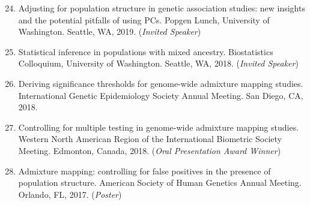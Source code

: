\documentclass[margin]{res}
\newenvironment{benumerate}[1]{
    \let\oldItem\item
    \def\item{\addtocounter{enumi}{-2}\oldItem}
    
    \begin{enumerate}
    \setcounter{enumi}{#1}
    \addtocounter{enumi}{1}
}{
    \end{enumerate}
}
\begin{document}
\begin{resume}
\begin{benumerate}{23}
\item Adjusting for population structure in genetic association studies: new insights and the potential pitfalls of using PCs. Popgen Lunch, University of Washington. Seattle, WA, 2019.  (\textit{Invited Speaker})




\item %
Statistical inference in populations with mixed ancestry. Biostatistics Colloquium, University of Washington. Seattle, WA, 2018.  (\textit{Invited Speaker})

\item %
Deriving significance thresholds for genome-wide admixture mapping studies. International Genetic Epidemiology Society Annual Meeting. San Diego, CA, 2018. 


\item %
Controlling for multiple testing in genome-wide admixture mapping studies. Western North American Region of the International Biometric Society Meeting. Edmonton, Canada, 2018. (\textit{Oral Presentation Award Winner})



\item %
Admixture mapping: controlling for false positives in the presence of population structure. American Society of Human Genetics Annual Meeting. Orlando, FL, 2017. (\textit{Poster})


\end{benumerate}
\end{resume}
\end{document}
